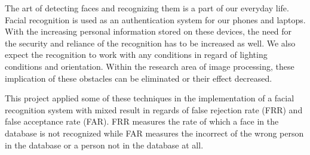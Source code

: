 The art of detecting faces and recognizing them is a part of our everyday life. Facial recognition is used as an authentication system for our phones and laptops. With the increasing personal information stored on these devices, the need for the security and reliance of the recognition has to be increased as well. We also expect the recognition to work with any conditions in regard of lighting conditions and orientation. Within the research area of image processing, these implication of these obstacles can be eliminated or their effect decreased.

This project applied some of these techniques in the implementation of a facial recognition system with mixed result in regards of false rejection rate (FRR) and false acceptance rate (FAR). FRR measures the rate of which a face in the database is not recognized while FAR measures the incorrect of the wrong person in the database or a person not in the database at all.

